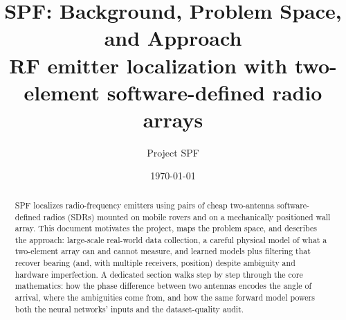 \documentclass[11pt]{article}
\title{SPF: Background, Problem Space, and Approach\\
\large RF emitter localization with two-element software-defined radio arrays}
\author{Project SPF}
\date{\today}
\begin{document}
\maketitle

\begin{abstract}
SPF localizes radio-frequency emitters using pairs of cheap two-antenna
software-defined radios (SDRs) mounted on mobile rovers and on a mechanically
positioned wall array. This document motivates the project, maps the problem
space, and describes the approach: large-scale real-world data collection, a
careful physical model of what a two-element array can and cannot measure, and
learned models plus filtering that recover bearing (and, with multiple
receivers, position) despite ambiguity and hardware imperfection. A dedicated
section walks step by step through the core mathematics: how the phase
difference between two antennas encodes the angle of arrival, where the
ambiguities come from, and how the same forward model powers both the neural
networks' inputs and the dataset-quality audit.
\end{abstract}

\tableofcontents
\clearpage






\end{document}
